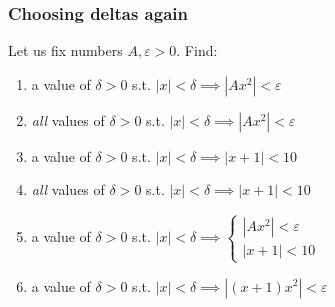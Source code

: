 \begin{frame}[t]
	\frametitle{Choosing deltas again}

	Let us fix numbers $A, \varepsilon >0$. Find:

	\vfill

	\begin{enumerate}
		\item a value of $\delta >0$ \; s.t. \hfill
			$\displaystyle |x|< \delta \implies |Ax^{2}|<\varepsilon$
			\vfill

		\item \emph{all} values of $\delta >0$ \; s.t. \hfill $\displaystyle |x|< \delta
			\implies |Ax^{2}|<\varepsilon$
			\vfill

		\item a value of $\delta >0$ \; s.t. \hfill
			$\displaystyle |x|< \delta \implies |x+1| < 10$
			\vfill

		\item \emph{all} values of $\delta >0$ \; s.t. \hfill $\displaystyle |x|< \delta
			\implies |x+1| < 10$
			\vfill

		\item a value of $\delta >0$ \; s.t. \hfill
			$\displaystyle |x|< \delta \implies \left\{
			\begin{array}{c}
				|Ax^2|<\varepsilon \\
				|x+1| < 10
			\end{array}
			\right.$
			\vfill

		\item a value of $\delta >0$ \; s.t. \hfill
			$\displaystyle |x| < \delta \implies |(x+1)x^{2}| < \varepsilon$
			\vfill
	\end{enumerate}
\end{frame}

